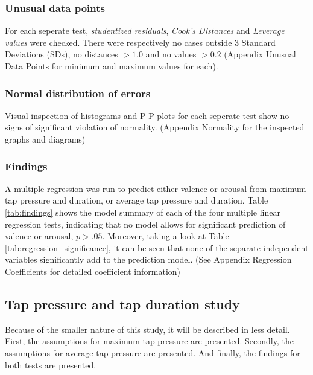 \documentclass{sigchi}
\begin{document}
\subsubsection{Unusual data points} %
\label{subsub:unusual_data_points}
For each seperate test, \textit{studentized residuals}, \textit{Cook's Distances} and \textit{Leverage values} were checked. There were respectively no cases outside 3 Standard Deviations (SDs), no distances $> 1.0$ and no values $> 0.2$ (Appendix Unusual Data Points for minimum and maximum values for each).

\subsubsection{Normal distribution of errors} %
\label{subsub:normal_distribution_of_errors}
Visual inspection of histograms and P-P plots for each seperate test show no signs of significant violation of normality. (Appendix Normality for the inspected graphs and diagrams)

\subsubsection{Findings} %
\label{sub:findings}
A multiple regression was run to predict either valence or arousal from maximum tap pressure and duration, or average tap pressure and duration. Table \ref{tab:findings} shows the model summary of each of the four multiple linear regression tests, indicating that no model allows for significant prediction of valence or arousal, $p > .05$. Moreover, taking a look at Table \ref{tab:regression_significance}, it can be seen that none of the separate independent variables significantly add to the prediction model. (See Appendix Regression Coefficients for detailed coefficient information)



\subsection{Tap pressure and tap duration study}
Because of the smaller nature of this study, it will be described in less detail. First, the assumptions for maximum tap pressure are presented. Secondly, the assumptions for average tap pressure are presented. And finally, the findings for both tests are presented.
\end{document}
